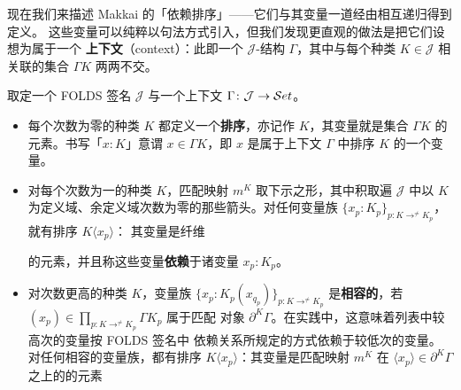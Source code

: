 现在我们来描述 Makkai 的「依赖排序」——它们与其变量一道经由相互递归得到定义。
这些变量可以纯粹以句法方式引入，但我们发现更直观的做法是把它们设想为属于一个%
\textbf{上下文}（context）：此即一个 $\mathcal{J}$-结构 $\Gamma$，其中与每个种类
$K\in\mathcal{J}$ 相关联的集合 $\Gamma K$ 两两不交。

\begin{definition}[排序及其变量]\label{def:sorts-variables}
取定一个 FOLDS 签名 $\mathcal{J}$ 与一个上下文 $\Gamma\colon\mathcal{J}\to\mathcal{S}et$。
\begin{itemize}
\item 每个次数为零的种类 $K$ 都定义一个\textbf{排序}，亦记作 $K$，其变量就是集合
  $\Gamma K$ 的元素。书写「$x:K$」意谓 $x\in\Gamma K$，即 $x$ 是属于上下文 $\Gamma$
  中排序 $K$ 的一个变量。
\item 对每个次数为一的种类 $K$，匹配映射 $m^{K}$ 取下示之形，其中积取遍
  $\mathcal{J}$ 中以 $K$ 为定义域、余定义域次数为零的那些箭头。对任何变量族
  $\{x_{p}\mathbin{:}K_{p}\}_{p\colon K\to^{\neq}K_{p}}$，就有排序 $K\langle x_{p}\rangle$：
  其变量是纤维
\begin{center}
\end{center}
  的元素，并且称这些变量\textbf{依赖}于诸变量 $x_{p}:K_{p}$。
\item 对次数更高的种类 $K$，变量族
  $\{x_{p}\mathbin{:}K_{p}(x_{q_{p}})\}_{p\colon K\to^{\neq}K_{p}}$
  是\textbf{相容的}，若 $(x_{p})\in\prod_{p\colon K\to^{\neq}K_{p}}\Gamma K_{p}$ 属于匹配
  对象 $\partial^{K}\Gamma$。在实践中，这意味着列表中较高次的变量按 FOLDS 签名中
  依赖关系所规定的方式依赖于较低次的变量。对任何相容的变量族，都有排序
  $K\langle x_{p}\rangle$：其变量是匹配映射 $m^{K}$ 在
  $\langle x_{p}\rangle\in\partial^{K}\Gamma$ 之上的\trFiber{}的元素
\begin{center}
\end{center}
\end{itemize}


\end{definition}
